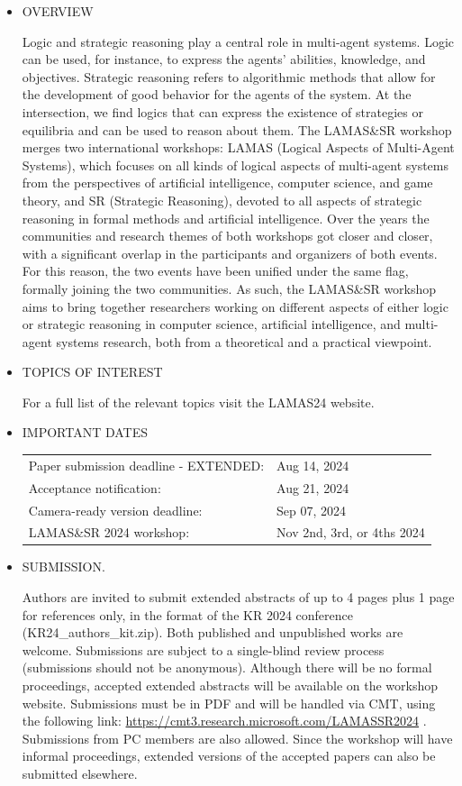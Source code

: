 \documentclass[prodmode,acmtecs]{acmsmall} %
\begin{document}
\begin{itemize}\item  OVERVIEW 
 
  Logic and strategic reasoning play a central role in multi-agent systems. Logic can be used, for instance, to express the agents' abilities, knowledge, and objectives. Strategic reasoning refers to algorithmic methods that allow for the development of good behavior for the agents of the system. At the intersection, we find logics that can express the existence of strategies or equilibria and can be used to reason about them. The LAMAS\&SR workshop merges two international workshops: LAMAS (Logical Aspects of Multi-Agent Systems), which focuses on all kinds of logical aspects of multi-agent systems from the perspectives of artificial intelligence, computer science, and game theory, and SR (Strategic Reasoning), devoted to all aspects of strategic reasoning in formal methods and artificial intelligence. Over the years the communities and research themes of both workshops got closer and closer, with a significant overlap in the participants and organizers of both events. For this reason, the two events have been unified under the same flag, formally joining the two communities. As such, the LAMAS\&SR workshop aims to bring together researchers working on different aspects of either logic or strategic reasoning in computer science, artificial intelligence, and multi-agent systems research, both from a theoretical and a practical viewpoint. 
 
\item  TOPICS OF INTEREST 
 
  For a full list of the relevant topics visit the LAMAS24 website.  
 
\item  IMPORTANT DATES 
 
\begin{tabulary}{\linewidth}{LL}Paper submission deadline - EXTENDED:  & Aug 14, 2024 \\
Acceptance notification:  & Aug 21, 2024 \\
Camera-ready version deadline:  & Sep 07, 2024 \\
LAMAS\&SR 2024 workshop:  & Nov 2nd, 3rd, or 4ths 2024 \\
\end{tabulary}
 
\item  SUBMISSION. 
 
  Authors are invited to submit extended abstracts of up to 4 pages plus 1 page for references only, in the format of the KR 2024 conference (KR24\_authors\_kit.zip). Both published and unpublished works are welcome. Submissions are subject to a single-blind review process (submissions should not be anonymous). Although there will be no formal proceedings, accepted extended abstracts will be available on the workshop website. Submissions must be in PDF and will be handled via CMT, using the following link: \href{https://cmt3.research.microsoft.com/LAMASSR2024}{https://cmt3.research.microsoft.com/LAMASSR2024} . Submissions from PC members are also allowed. Since the workshop will have informal proceedings, extended versions of the accepted papers can also be submitted elsewhere. 
 

\end{itemize}
\end{document}

